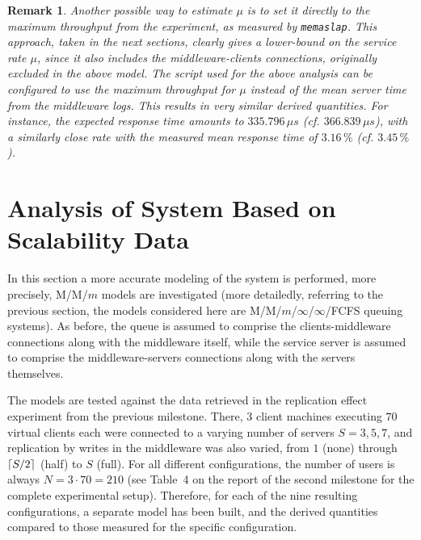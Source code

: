 \documentclass[11pt]{article}
\newcommand\task[1]{{\color[HTML]{999999}\subsection{Task}#1}}
\renewcommand\task[1]{}
\DeclarePairedDelimiter{\ceil}{\lceil}{\rceil}
\newtheorem{rem}{Remark}
\theoremstyle{definition}
\renewcommand\t\texttt
\begin{document}
\begin{rem}
    \label{rem:alt}
    Another possible way to estimate $\mu$ is to set it directly to the maximum throughput from the experiment, as measured by \t{memaslap}.
    This approach, taken in the next sections, clearly gives a lower-bound on the service rate $\mu$, since it also includes the middleware-clients connections, originally excluded in the above model.
    The script used for the above analysis can be configured to use the maximum throughput for $\mu$ instead of the mean server time from the middleware logs.
    This results in very similar derived quantities.
    For instance, the expected response time amounts to $335.796\,\mu s$ (cf. $366.839\,\mu s$), with a similarly close rate with the measured mean response time of $3.16\,\%$ (cf. $3.45\,\%$).
\end{rem}

\task{
Length: 1-2 pages

Build an M/M/1 model of your entire system based on the stability trace that you had to run for the first milestone. Explain the characteristics and behavior of the model built, and compare it with the experimental data (collected both outside and inside the middleware). Analyze the modeled and real-life behavior of the system (explain the similarities, the differences, and map them to aspects of the design or the experiments). Make sure to follow the model-related guidelines described in the Notes!}

\clearpage

\section{Analysis of System Based on Scalability Data}\label{sec:analysis-scalability}

In this section a more accurate modeling of the system is performed, more precisely, M/M/$m$ models are investigated (more detailedly, referring to the previous section, the models considered here are M/M/$m$/$\infty$/$\infty$/FCFS queuing systems).
As before, the queue is assumed to comprise the clients-middleware connections along with the middleware itself, while the service server is assumed to comprise the middleware-servers connections along with the servers themselves.

The models are tested against the data retrieved in the replication effect experiment from the previous milestone.
There, $3$ client machines executing $70$ virtual clients each were connected to a varying number of servers $S=3,5,7$, and replication by writes in the middleware was also varied, from $1$ (none) through $\ceil{S/2}$ (half) to $S$ (full).
For all different configurations, the number of users is always $N=3\cdot70=210$ (see Table~4 on the report of the second milestone for the complete experimental setup).
Therefore, for each of the nine resulting configurations, a separate model has been built, and the derived quantities compared to those measured for the  specific configuration.
\end{document}

